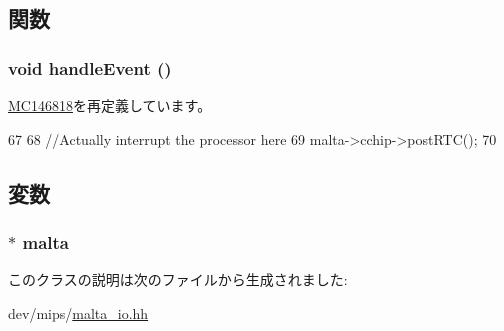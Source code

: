 \subsection{関数}
\hypertarget{classMaltaIO_1_1RTC_af592dd6aaf1c9c6af780a5cbc531417e}{
\subsubsection[{handleEvent}]{\setlength{\rightskip}{0pt plus 5cm}void handleEvent ()}}
\label{classMaltaIO_1_1RTC_af592dd6aaf1c9c6af780a5cbc531417e}


\hyperlink{classMC146818_a30dfd044b822d58a6ff7335f815af8b1}{MC146818}を再定義しています。


\begin{DoxyCode}
67         {
68             //Actually interrupt the processor here
69             malta->cchip->postRTC();
70         }
\end{DoxyCode}


\subsection{変数}
\hypertarget{classMaltaIO_1_1RTC_ae7ba1afe6be03355de9c5cbc41c11f96}{
\subsubsection[{malta}]{$\ast$ {\bf malta}}}
\label{classMaltaIO_1_1RTC_ae7ba1afe6be03355de9c5cbc41c11f96}


このクラスの説明は次のファイルから生成されました:\begin{DoxyCompactItemize}
\item 
dev/mips/\hyperlink{malta__io_8hh}{malta\_\-io.hh}\end{DoxyCompactItemize}

